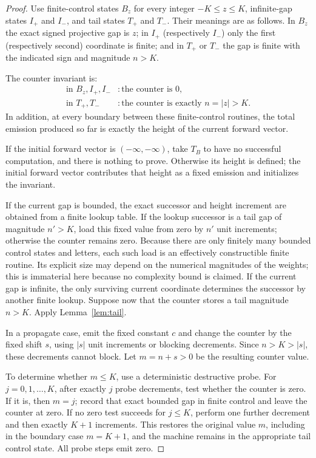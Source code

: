 \documentclass[11pt]{article}
\newcommand{\minf}{-\infty}
\begin{document}
\begin{proof}
Use finite-control states $B_z$ for every integer $-K\le z\le K$, infinite-gap states $I_+$ and $I_-$, and tail states $T_+$ and $T_-$. Their meanings are as follows. In $B_z$ the exact signed projective gap is $z$; in $I_+$ (respectively $I_-$) only the first (respectively second) coordinate is finite; and in $T_+$ or $T_-$ the gap is finite with the indicated sign and magnitude $n>K$.

The counter invariant is:
\[
\begin{array}{ll}
\text{in }B_z,I_+,I_- &: \text{the counter is }0,\\
\text{in }T_+,T_- &: \text{the counter is exactly }n=|z|>K.
\end{array}
\]
In addition, at every boundary between these finite-control routines, the total emission produced so far is exactly the height of the current forward vector.

If the initial forward vector is $(\minf,\minf)$, take $T_B$ to have no successful computation, and there is nothing to prove. Otherwise its height is defined; the initial forward vector contributes that height as a fixed emission and initializes the invariant.

If the current gap is bounded, the exact successor and height increment are obtained from a finite lookup table. If the lookup successor is a tail gap of magnitude $n'>K$, load this fixed value from zero by $n'$ unit increments; otherwise the counter remains zero. Because there are only finitely many bounded control states and letters, each such load is an effectively constructible finite routine. Its explicit size may depend on the numerical magnitudes of the weights; this is immaterial here because no complexity bound is claimed. If the current gap is infinite, the only surviving current coordinate determines the successor by another finite lookup. Suppose now that the counter stores a tail magnitude $n>K$. Apply Lemma~\ref{lem:tail}.

In a propagate case, emit the fixed constant $c$ and change the counter by the fixed shift $s$, using $|s|$ unit increments or blocking decrements. Since $n>K>|s|$, these decrements cannot block. Let $m=n+s>0$ be the resulting counter value.

To determine whether $m\le K$, use a deterministic destructive probe. For $j=0,1,\ldots,K$, after exactly $j$ probe decrements, test whether the counter is zero. If it is, then $m=j$; record that exact bounded gap in finite control and leave the counter at zero. If no zero test succeeds for $j\le K$, perform one further decrement and then exactly $K+1$ increments. This restores the original value $m$, including in the boundary case $m=K+1$, and the machine remains in the appropriate tail control state. All probe steps emit zero.


\end{proof}
\end{document}
